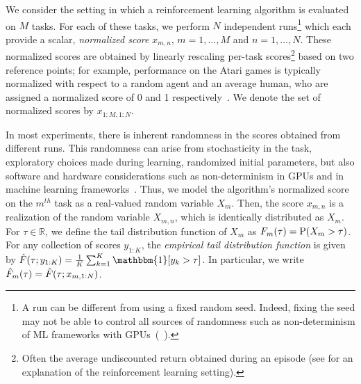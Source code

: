 

We consider the setting in which a reinforcement learning algorithm is evaluated on $M$ tasks. For each of these tasks, we perform $N$ independent runs\footnote{A run can be different from using a fixed random seed. Indeed, fixing the seed may not be able to control all sources of randomness such as non-determinism of ML frameworks with GPUs~(\eg~). } which each provide a scalar, \emph{normalized score} $x_{m,n}$, $m = 1, \dots, M$ and $n = 1, \dots, N$. These normalized scores are obtained by linearly rescaling per-task scores\footnote{Often the average undiscounted return obtained during an episode (see \citet{sutton18reinforcement} for an explanation of the reinforcement learning setting).}
based on two reference points; for example, performance on the Atari games is typically normalized with respect to a random agent and an average human, who are assigned a normalized score of 0 and 1 respectively~\citep{mnih2015human}. We denote the set of normalized scores by $x_{{1:M}, {1:N}}$.


In most experiments, there is inherent randomness in the scores obtained from different runs. This randomness can arise from stochasticity in the task, exploratory choices made during learning, randomized initial parameters, but also software and hardware considerations such as non-determinism in GPUs and in machine learning frameworks~\citep{zhuang2021randomness}. Thus, we model the algorithm's normalized score on the $m^{th}$ task as a real-valued random variable $X_{m}$. Then, the score $x_{m, n}$ is a realization of the random variable $X_{m,n}$, which is identically distributed as $X_{m}$. For $\tau \in \mathbb{R}$, we define the tail distribution function of $X_m$ as $F_{m}(\tau) = \mathrm{P}(X_m > \tau)$. For any collection of scores $y_{1:K}$, the \emph{empirical tail distribution function} is given by $\hat F(\tau; y_{1:K}) = \tfrac{1}{K} \sum_{k=1}^{K} \mathbbm{1}[y_k > \tau]$.
In particular, we write $\hat{F}_{m}(\tau) = \hat F(\tau; x_{m, 1:N})$.

